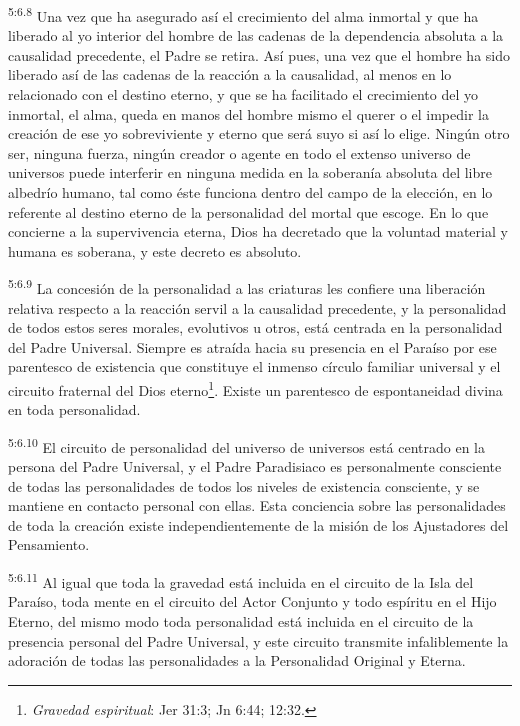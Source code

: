 \par
\textsuperscript{5:6.8} Una vez que ha asegurado así el crecimiento del alma inmortal y que ha liberado al yo interior del hombre de las cadenas de la dependencia absoluta a la causalidad precedente, el Padre se retira. Así pues, una vez que el hombre ha sido liberado así de las cadenas de la reacción a la causalidad, al menos en lo relacionado con el destino eterno, y que se ha facilitado el crecimiento del yo inmortal, el alma, queda en manos del hombre mismo el querer o el impedir la creación de ese yo sobreviviente y eterno que será suyo si así lo elige. Ningún otro ser, ninguna fuerza, ningún creador o agente en todo el extenso universo de universos puede interferir en ninguna medida en la soberanía absoluta del libre albedrío humano, tal como éste funciona dentro del campo de la elección, en lo referente al destino eterno de la personalidad del mortal que escoge. En lo que concierne a la supervivencia eterna, Dios ha decretado que la voluntad material y humana es soberana, y este decreto es absoluto.

\par
\textsuperscript{5:6.9} La concesión de la personalidad a las criaturas les confiere una liberación relativa respecto a la reacción servil a la causalidad precedente, y la personalidad de todos estos seres morales, evolutivos u otros, está centrada en la personalidad del Padre Universal. Siempre es atraída hacia su presencia en el Paraíso por ese parentesco de existencia que constituye el inmenso círculo familiar universal y el circuito fraternal del Dios eterno\footnote{\textit{Gravedad espiritual}: Jer 31:3; Jn 6:44; 12:32.}. Existe un parentesco de espontaneidad divina en toda personalidad.

\par
\textsuperscript{5:6.10} El circuito de personalidad del universo de universos está centrado en la persona del Padre Universal, y el Padre Paradisiaco es personalmente consciente de todas las personalidades de todos los niveles de existencia consciente, y se mantiene en contacto personal con ellas. Esta conciencia sobre las personalidades de toda la creación existe independientemente de la misión de los Ajustadores del Pensamiento.

\par
\textsuperscript{5:6.11} Al igual que toda la gravedad está incluida en el circuito de la Isla del Paraíso, toda mente en el circuito del Actor Conjunto y todo espíritu en el Hijo Eterno, del mismo modo toda personalidad está incluida en el circuito de la presencia personal del Padre Universal, y este circuito transmite infaliblemente la adoración de todas las personalidades a la Personalidad Original y Eterna.

